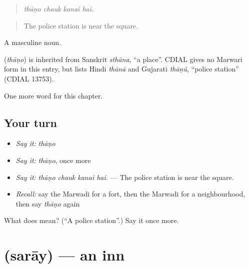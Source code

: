 \begin{quote}
   
\end{quote}

\begin{quote}
\emph{thāṇo chauk kanai hai.}
\end{quote}

\begin{quote}
The police station is near the square.
\end{quote}

A masculine noun.

\begin{cousinweb}
\textbf{} (\emph{thāṇo}) is inherited from Sanskrit \emph{sthāna}, \textquotedblleft{}a place\textquotedblright{}. CDIAL gives no Marwari form in this entry, but lists Hindi \emph{thānā} and Gujarati \emph{thāṇũ}, \textquotedblleft{}police station\textquotedblright{} (CDIAL 13753).
\end{cousinweb}

\begin{grammarlens}[title={What you've built}]
One more word for this chapter.
\end{grammarlens}

\subsection*{Your turn}
\begin{itemize}
\raggedright
  \item \emph{Say it:} \emph{thāṇo}
  \item \emph{Say it:} \emph{thāṇo}, once more
  \item \emph{Say it:} \emph{thāṇo chauk kanai hai.} — The police station is near the square.
  \item \emph{Recall:} say the Marwadi for a fort, then the Marwadi for a neighbourhood, then say \emph{thāṇo} again
\end{itemize}

\begin{tcolorbox}[breakable,colback=teal!4,colframe=teal!35!black,title={Before you move on}]
What does  mean? (\textquotedblleft{}A police station\textquotedblright{}.) Say it once more.
\end{tcolorbox}
\section[\texorpdfstring{\mw{सराय} (sarāy)}{सराय (sarāy)}]{ (sarāy) — an inn}

